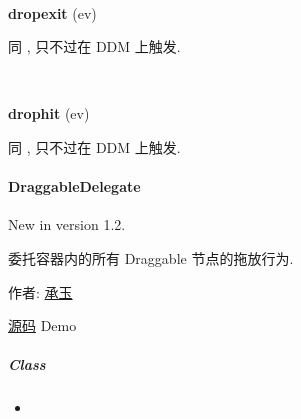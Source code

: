 \documentclass[letterpaper,10pt,english]{sphinxmanual}
\begin{document}

\begin{fulllineitems}
\label{api/component/dd/ddm:DDM.dropexit}~
\begin{DUlineblock}{0em}
\item[] \textbf{dropexit} (ev)
\item[] 同 {\hyperref[api/component/dd/droppable:Droppable.dropexit]{}} , 只不过在 DDM 上触发.
\end{DUlineblock}

\end{fulllineitems}



\begin{fulllineitems}
\label{api/component/dd/ddm:DDM.drophit}~
\begin{DUlineblock}{0em}
\item[] \textbf{drophit} (ev)
\item[] 同 {\hyperref[api/component/dd/droppable:Droppable.drophit]{}} , 只不过在 DDM 上触发.
\end{DUlineblock}

\end{fulllineitems}

\label{api/component/dd/draggable-delegate:module-DraggableDelegate}

\paragraph{DraggableDelegate}
\label{api/component/dd/draggable-delegate::doc}\label{api/component/dd/draggable-delegate:draggabledelegate}New in version 1.2.
\begin{DUlineblock}{0em}
\item[] 委托容器内的所有 Draggable 节点的拖放行为.
\item[] 作者: \href{mailto:chengyu@taobao.com}{承玉}
\item[] \href{https://github.com/kissyteam/kissy/tree/master/src/dd/draggable-delegate.js}{源码}  \textbar{} Demo
\end{DUlineblock}


\subparagraph{Class}
\label{api/component/dd/draggable-delegate:class}\begin{itemize}
\item {}
{\hyperref[api/component/dd/draggable-delegate:DraggableDelegate.DraggableDelegate]{}}

\end{itemize}
\end{document}
